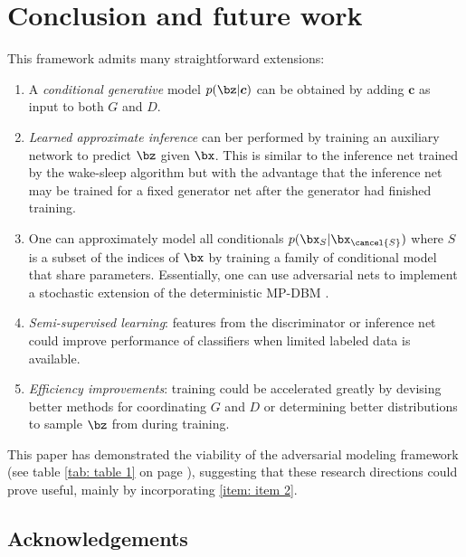 \section{Conclusion and future work}

This framework admits many straightforward extensions:

\begin{enumerate}
	\item A \emph{conditional generative} model $p(\bz | \boldsymbol{c})$ can be obtained by adding $\boldsymbol{c}$ as input to both $G$ and $D$.
	\item \emph{Learned approximate inference} can ber performed by training an auxiliary network to predict $\bz$ given $\bx$. This is similar to the inference net trained by the wake-sleep algorithm \cite{15_doi:10.1126/science.7761831} but with the advantage that the inference net may be trained for a fixed generator net after the generator had finished training.\label{item: item 2}
	\item One can approximately model all conditionals $p(\bx_S | \bx_{\cancel{S}})$
	where $S$ is a subset of the indices of $\bx$ by training a family of conditional model that share parameters. Essentially, one can use adversarial nets to implement a stochastic extension of the deterministic MP-DBM \cite{11_NIPS2013_0bb4aec1}.
	\item \emph{Semi-supervised learning}: features from the discriminator or inference net could improve performance of classifiers when limited labeled data is available.
	\item \emph{Efficiency improvements}: training could be accelerated greatly by devising better methods for coordinating $G$ and $D$ or determining better distributions to sample $\bz$ from during training.
\end{enumerate}

This paper has demonstrated the viability of the adversarial modeling framework (see table \ref{tab: table 1} on page \pageref{tab: table 1}), suggesting that these research directions could prove useful, mainly by incorporating \ref{item: item 2}.

\subsection*{Acknowledgements}

